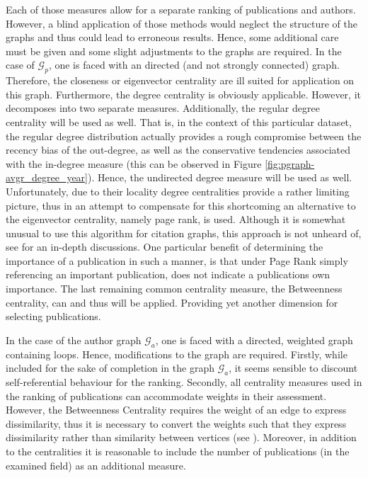 \documentclass[11pt,a4paper]{book}
\theoremstyle{definition}
\theoremstyle{definition}
\theoremstyle{definition}
\theoremstyle{remark}
\newcommand{\pgraph}{\mathcal{G}_{p}}
\newcommand{\agraph}{\mathcal{G}_{a}}
\begin{document}
Each of those measures allow for a separate ranking of publications and authors. 
However, a blind application of those methods would neglect the structure of the graphs and thus could lead to erroneous results. Hence, some additional care must be given and some slight adjustments to the graphs are required.
In the case of $\pgraph$, one is faced with an directed (and not strongly connected) graph. Therefore, the closeness or eigenvector centrality are ill suited for application on this graph.
Furthermore, the degree centrality is obviously applicable. However, it decomposes into two separate measures. Additionally, the regular degree centrality will be used as well. That is, in the context of this particular dataset, the regular degree distribution actually provides a rough compromise between the recency bias of the out-degree, as well as the conservative tendencies associated with the in-degree measure (this can be observed in Figure \ref{fig:pgraph-avgr_degree_year}). Hence, the undirected degree measure will be used as well. Unfortunately, due to their locality degree centralities provide a rather limiting picture, thus in an attempt to compensate for this shortcoming an alternative to the eigenvector centrality, namely page rank, is used. Although it is somewhat unusual to use this algorithm for citation graphs, this approach is not unheard of, see \parencite{ding2009pagerank,ma2008bringing,chen2007finding,maslov2008promise,nykl2014pagerank} for an in-depth discussions. One particular benefit of determining the importance of a publication in such a manner, is that under Page Rank simply referencing an important publication, does not indicate a publications own importance. The last remaining common centrality measure, the Betweenness centrality, can and thus will be applied. Providing yet another dimension for selecting publications. 


In the case of the author graph $\agraph$, one is faced with a directed, weighted graph containing loops. Hence, modifications to the graph are required. Firstly, while included for the sake of completion in the graph $\agraph$, it seems sensible to discount self-referential behaviour for the ranking. Secondly, all centrality measures used in the ranking of publications
can accommodate weights in their assessment. However, the Betweenness Centrality requires the weight of an edge to express dissimilarity, thus it is necessary to convert the weights such that they express dissimilarity rather than similarity between vertices (see \cite[p.~13]{runkler2012data}). Moreover, in addition to the centralities it is reasonable to include the number of publications (in the examined field) as an additional measure. 
\end{document}
